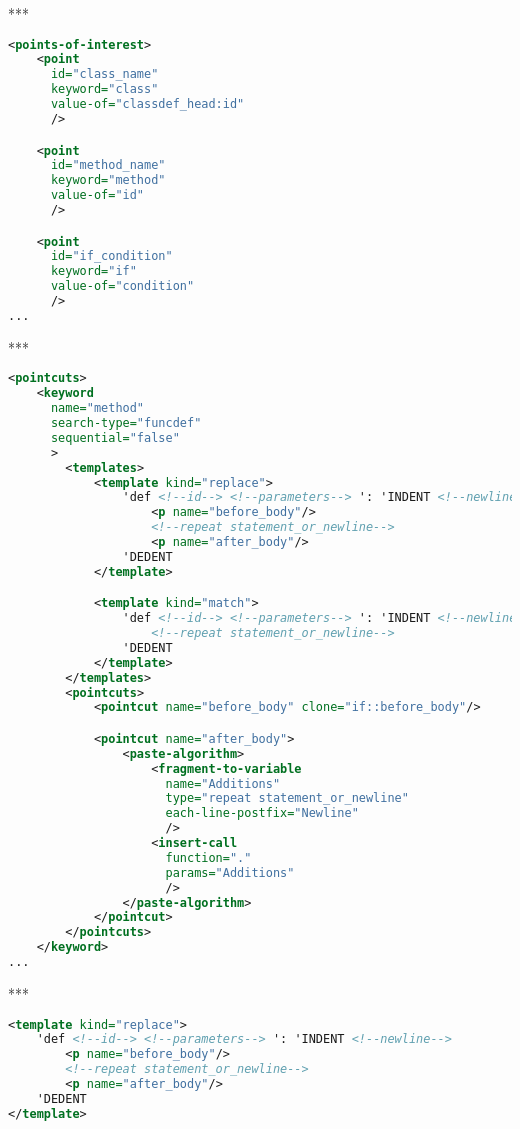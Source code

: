 ***

\begin{lstlisting}[frame=single, language=XML, label={annotation-pois-example}, caption={Пример}]
<points-of-interest>
    <point
      id="class_name"
      keyword="class"
      value-of="classdef_head:id"
      />

    <point
      id="method_name"
      keyword="method"
      value-of="id"
      />

    <point
      id="if_condition"
      keyword="if"
      value-of="condition"
      />
...
\end{lstlisting}

***

\begin{lstlisting}[frame=single, language=XML, label={annotation-pointcuts-example}, caption={Пример}]
<pointcuts>
    <keyword
      name="method"
      search-type="funcdef"
      sequential="false"
      >
        <templates>
            <template kind="replace">
                'def <!--id--> <!--parameters--> ': 'INDENT <!--newline-->
                    <p name="before_body"/>
                    <!--repeat statement_or_newline-->
                    <p name="after_body"/>
                'DEDENT
            </template>

            <template kind="match">
                'def <!--id--> <!--parameters--> ': 'INDENT <!--newline-->
                    <!--repeat statement_or_newline-->
                'DEDENT
            </template>
        </templates>
        <pointcuts>
            <pointcut name="before_body" clone="if::before_body"/>

            <pointcut name="after_body">
                <paste-algorithm>
                    <fragment-to-variable
                      name="Additions"
                      type="repeat statement_or_newline"
                      each-line-postfix="Newline"
                      />
                    <insert-call
                      function="."
                      params="Additions"
                      />
                </paste-algorithm>
            </pointcut>
        </pointcuts>
    </keyword>
...
\end{lstlisting}

***

\begin{lstlisting}[frame=single, language=XML, label={annotation-template-example}, caption={Пример}]
<template kind="replace">
    'def <!--id--> <!--parameters--> ': 'INDENT <!--newline-->
        <p name="before_body"/>
        <!--repeat statement_or_newline-->
        <p name="after_body"/>
    'DEDENT
</template>
\end{lstlisting}

